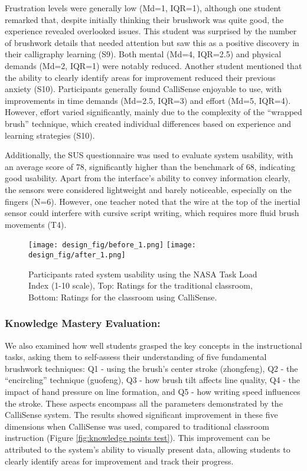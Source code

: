 Frustration levels were generally low (Md=1, IQR=1), although one student remarked that, despite initially thinking their brushwork was quite good, the experience revealed overlooked issues. This student was surprised by the number of brushwork details that needed attention but saw this as a positive discovery in their calligraphy learning (S9). Both mental (Md=4, IQR=2.5) and physical demands (Md=2, IQR=1) were notably reduced. Another student mentioned that the ability to clearly identify areas for improvement reduced their previous anxiety (S10). Participants generally found CalliSense enjoyable to use, with improvements in time demands (Md=2.5, IQR=3) and effort (Md=5, IQR=4). However, effort varied significantly, mainly due to the complexity of the ``wrapped brush'' technique, which created individual differences based on experience and learning strategies (S10).

Additionally, the SUS questionnaire was used to evaluate system usability, with an average score of 78, significantly higher than the benchmark of 68, indicating good usability. Apart from the interface's ability to convey information clearly, the sensors were considered lightweight and barely noticeable, especially on the fingers (N=6). However, one teacher noted that the wire at the top of the inertial sensor could interfere with cursive script writing, which requires more fluid brush movements (T4).
\begin{figure*}[h]
    \centering
        \texttt{[image: design\_fig/before\_1.png]}
        \texttt{[image: design\_fig/after\_1.png]}
    \caption{Participants rated system usability using the NASA Task Load Index (1-10 scale), Top: Ratings for the traditional classroom, Bottom: Ratings for the classroom using CalliSense.}
    \label{fig: NASA}
\end{figure*}


\subsubsection{Knowledge Mastery Evaluation:}

We also examined how well students grasped the key concepts in the instructional tasks, asking them to self-assess their understanding of five fundamental brushwork techniques: Q1 - using the brush's center stroke (zhongfeng), Q2 - the ``encircling'' technique (guofeng), Q3 - how brush tilt affects line quality, Q4 - the impact of hand pressure on line formation, and Q5 - how writing speed influences the stroke. These aspects encompass all the parameters demonstrated by the CalliSense system. The results showed significant improvement in these five dimensions when CalliSense was used, compared to traditional classroom instruction (Figure \ref{fig:knowledge points test}). This improvement can be attributed to the system's ability to visually present data, allowing students to clearly identify areas for improvement and track their progress.


